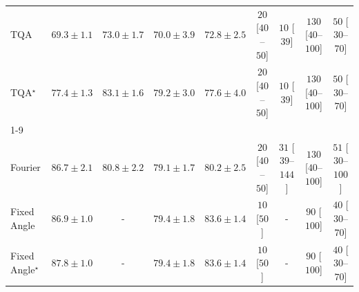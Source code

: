 \begin{tabular}{l|cccc|cccc|}
TQA & {\cellcolor[HTML]{FFF8C4}} \color[HTML]{000000} $69.3\pm 1.1$ & {\cellcolor[HTML]{FEDC82}} \color[HTML]{000000} $73.0\pm 1.7$ & {\cellcolor[HTML]{FFF5B8}} \color[HTML]{000000} $70.0\pm 3.9$ & {\cellcolor[HTML]{FEDE86}} \color[HTML]{000000} $72.8\pm 2.5$ & {\cellcolor[HTML]{FFF5F1}} \color[HTML]{000000} $20$ [$40$--$50$] & {\cellcolor[HTML]{FFF7F3}} \color[HTML]{000000} $10$ [$39$] & {\cellcolor[HTML]{FDDBD7}} \color[HTML]{000000} $130$ [$40$--$100$] & {\cellcolor[HTML]{FEEEEB}} \color[HTML]{000000} $50$ [$30$--$70$] \\
TQA$^\star$ & {\cellcolor[HTML]{FE9E2D}} \color[HTML]{000000} $77.4\pm 1.3$ & {\cellcolor[HTML]{C84A02}} \color[HTML]{F1F1F1} $83.1\pm 1.6$ & {\cellcolor[HTML]{F4811D}} \color[HTML]{F1F1F1} $79.2\pm 3.0$ & {\cellcolor[HTML]{FE9A2A}} \color[HTML]{000000} $77.6\pm 4.0$ & {\cellcolor[HTML]{FFF5F1}} \color[HTML]{000000} $20$ [$40$--$50$] & {\cellcolor[HTML]{FFF7F3}} \color[HTML]{000000} $10$ [$39$] & {\cellcolor[HTML]{FDDBD7}} \color[HTML]{000000} $130$ [$40$--$100$] & {\cellcolor[HTML]{FEEEEB}} \color[HTML]{000000} $50$ [$30$--$70$] \\
\cline{1-9}
\multicolumn{9}{c}{\rule{0pt}{8pt}PP} \\
\midrule
Fourier & {\cellcolor[HTML]{005931}} \color[HTML]{F1F1F1} $86.7\pm 2.1$ & {\cellcolor[HTML]{3BA358}} \color[HTML]{F1F1F1} $80.8\pm 2.2$ & {\cellcolor[HTML]{5AB76A}} \color[HTML]{F1F1F1} $79.1\pm 1.7$ & {\cellcolor[HTML]{43AC5E}} \color[HTML]{F1F1F1} $80.2\pm 2.5$ & {\cellcolor[HTML]{FFF5F1}} \color[HTML]{000000} $20$ [$40$--$50$] & {\cellcolor[HTML]{FFF3EF}} \color[HTML]{000000} $31$ [$39$--$144$] & {\cellcolor[HTML]{FDDBD7}} \color[HTML]{000000} $130$ [$40$--$100$] & {\cellcolor[HTML]{FEEEEA}} \color[HTML]{000000} $51$ [$30$--$100$] \\
Fixed Angle & {\cellcolor[HTML]{005530}} \color[HTML]{F1F1F1} $86.9\pm 1.0$ & {\cellcolor[HTML]{000000}} \color[HTML]{F1F1F1} {\cellcolor{white}} \color{black} - & {\cellcolor[HTML]{53B466}} \color[HTML]{F1F1F1} $79.4\pm 1.8$ & {\cellcolor[HTML]{197C40}} \color[HTML]{F1F1F1} $83.6\pm 1.4$ & {\cellcolor[HTML]{FFF7F3}} \color[HTML]{000000} $10$ [$50$] & {\cellcolor[HTML]{000000}} \color[HTML]{F1F1F1} {\cellcolor{white}} \color{black} - & {\cellcolor[HTML]{FDE5E2}} \color[HTML]{000000} $90$ [$100$] & {\cellcolor[HTML]{FEF1ED}} \color[HTML]{000000} $40$ [$30$--$70$] \\
Fixed Angle$^\star$ & {\cellcolor[HTML]{00492B}} \color[HTML]{F1F1F1} $87.8\pm 1.0$ & {\cellcolor[HTML]{000000}} \color[HTML]{F1F1F1} {\cellcolor{white}} \color{black} - & {\cellcolor[HTML]{53B466}} \color[HTML]{F1F1F1} $79.4\pm 1.8$ & {\cellcolor[HTML]{197C40}} \color[HTML]{F1F1F1} $83.6\pm 1.4$ & {\cellcolor[HTML]{FFF7F3}} \color[HTML]{000000} $10$ [$50$] & {\cellcolor[HTML]{000000}} \color[HTML]{F1F1F1} {\cellcolor{white}} \color{black} - & {\cellcolor[HTML]{FDE5E2}} \color[HTML]{000000} $90$ [$100$] & {\cellcolor[HTML]{FEF1ED}} \color[HTML]{000000} $40$ [$30$--$70$] \\

\end{tabular}
